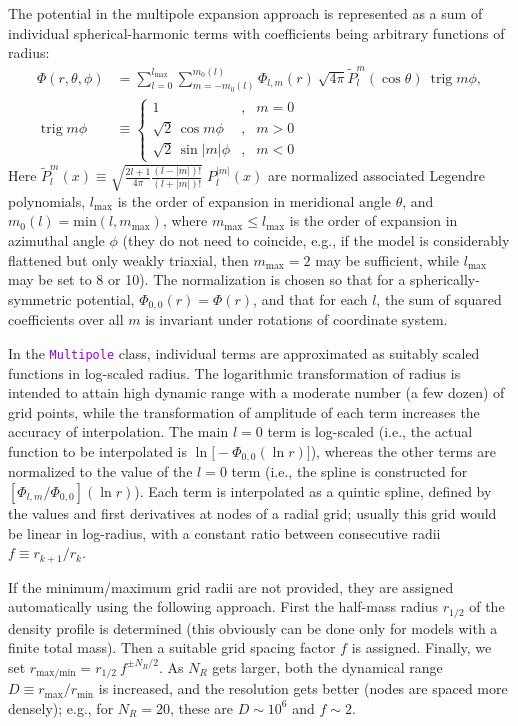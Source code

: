 \documentclass[12pt]{article}
\newcommand{\ttt}[1]{\textcolor{darkviolet}{\texttt{#1}}}
\DeclareMathOperator{\trig}{trig}
\begin{document}
The potential in the multipole expansion approach is represented as a sum of individual spherical-harmonic terms with coefficients being arbitrary functions of radius:
\begin{align}
\Phi(r,\theta,\phi) &= \sum_{l=0}^{l_\mathrm{max}}\sum_{m=-m_0(l)}^{m_0(l)}
\Phi_{l,m}(r)\: \sqrt{4\pi} \tilde P_l^m(\cos\theta)\:\trig m\phi, \\
\trig m\phi &\equiv \left\{\begin{array}{rcl} 
  1 &,& m=0 \\
  \sqrt{2}\,\cos  m \phi &,& m > 0 \\
  \sqrt{2}\,\sin |m|\phi &,& m < 0 
\end{array}\right.   \nonumber
\end{align}
Here $\tilde P_l^m(x) \equiv \sqrt{\frac{2l+1}{4\pi}\frac{(l-|m|)!}{(l+|m|)!}} \;P_l^{|m|}(x)$ 
are normalized associated Legendre polynomials, $l_\mathrm{max}$ is the order of expansion in meridional angle $\theta$, and $m_0(l) = \mathrm{min}(l, m_\mathrm{max})$, where $m_\mathrm{max} \le l_\mathrm{max}$ is the order of expansion in azimuthal angle $\phi$ (they do not need to coincide, e.g., if the model is considerably flattened but only weakly triaxial, then $m_\mathrm{max}=2$ may be sufficient, while $l_\mathrm{max}$ may be set to 8 or 10). The normalization is chosen so that for a spherically-symmetric potential, $\Phi_{0,0}(r)=\Phi(r)$, and that for each $l$, the sum of squared coefficients over all $m$ is invariant under rotations of coordinate system.

In the \ttt{Multipole} class, individual terms are approximated as suitably scaled functions in log-scaled radius. The logarithmic transformation of radius is intended to attain high dynamic range with a moderate number (a few dozen) of grid points, while the transformation of amplitude of each term increases the accuracy of interpolation. The main $l=0$ term is log-scaled (i.e., the actual function to be interpolated is $\ln\big[-\Phi_{0,0}(\ln r)\big]$), whereas the other terms are normalized to the value of the $l=0$ term (i.e., the spline is constructed for $[\Phi_{l,m}/\Phi_{0,0}](\ln r)$). Each term is interpolated as a quintic spline, defined by the values and first derivatives at nodes of a radial grid; usually this grid would be linear in log-radius, with a constant ratio between consecutive radii $f\equiv r_{k+1}/r_k$.

If the minimum/maximum grid radii are not provided, they are assigned automatically using the following approach. First the half-mass radius $r_{1/2}$ of the density profile is determined (this obviously can be done only for models with a finite total mass). Then a suitable grid spacing factor $f$ is assigned. Finally, we set $r_\mathrm{max/min} = r_{1/2}\: f^{\pm N_R/2}$. As $N_R$ gets larger, both the dynamical range $D\equiv r_\mathrm{max}/r_\mathrm{min}$ is increased, and the resolution gets better (nodes are spaced more densely); e.g., for $N_R=20$, these are $D\sim 10^6$ and $f\sim 2$.
\end{document}
